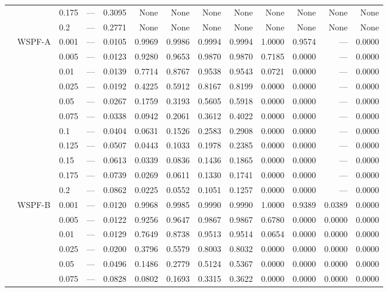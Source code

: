{\begin{longtable}{@{}lllrrrrrrrrrr@{}}
 &  & 0.175 & --- & 0.3095 & None & None & None & None & None & None & None & None \\
 &  & 0.2 & --- & 0.2771 & None & None & None & None & None & None & None & None \\
 & WSPF-A & 0.001 & --- & 0.0105 & 0.9969 & 0.9986 & 0.9994 & 0.9994 & 1.0000 & 0.9574 & --- & 0.0000 \\
 &  & 0.005 & --- & 0.0123 & 0.9280 & 0.9653 & 0.9870 & 0.9870 & 0.7185 & 0.0000 & --- & 0.0000 \\
 &  & 0.01 & --- & 0.0139 & 0.7714 & 0.8767 & 0.9538 & 0.9543 & 0.0721 & 0.0000 & --- & 0.0000 \\
 &  & 0.025 & --- & 0.0192 & 0.4225 & 0.5912 & 0.8167 & 0.8199 & 0.0000 & 0.0000 & --- & 0.0000 \\
 &  & 0.05 & --- & 0.0267 & 0.1759 & 0.3193 & 0.5605 & 0.5918 & 0.0000 & 0.0000 & --- & 0.0000 \\
 &  & 0.075 & --- & 0.0338 & 0.0942 & 0.2061 & 0.3612 & 0.4022 & 0.0000 & 0.0000 & --- & 0.0000 \\
 &  & 0.1 & --- & 0.0404 & 0.0631 & 0.1526 & 0.2583 & 0.2908 & 0.0000 & 0.0000 & --- & 0.0000 \\
 &  & 0.125 & --- & 0.0507 & 0.0443 & 0.1033 & 0.1978 & 0.2385 & 0.0000 & 0.0000 & --- & 0.0000 \\
 &  & 0.15 & --- & 0.0613 & 0.0339 & 0.0836 & 0.1436 & 0.1865 & 0.0000 & 0.0000 & --- & 0.0000 \\
 &  & 0.175 & --- & 0.0739 & 0.0269 & 0.0611 & 0.1330 & 0.1741 & 0.0000 & 0.0000 & --- & 0.0000 \\
 &  & 0.2 & --- & 0.0862 & 0.0225 & 0.0552 & 0.1051 & 0.1257 & 0.0000 & 0.0000 & --- & 0.0000 \\
 & WSPF-B & 0.001 & --- & 0.0120 & 0.9968 & 0.9985 & 0.9990 & 0.9990 & 1.0000 & 0.9389 & 0.0389 & 0.0000 \\
 &  & 0.005 & --- & 0.0122 & 0.9256 & 0.9647 & 0.9867 & 0.9867 & 0.6780 & 0.0000 & 0.0000 & 0.0000 \\
 &  & 0.01 & --- & 0.0129 & 0.7649 & 0.8738 & 0.9513 & 0.9514 & 0.0654 & 0.0000 & 0.0000 & 0.0000 \\
 &  & 0.025 & --- & 0.0200 & 0.3796 & 0.5579 & 0.8003 & 0.8032 & 0.0000 & 0.0000 & 0.0000 & 0.0000 \\
 &  & 0.05 & --- & 0.0496 & 0.1486 & 0.2779 & 0.5124 & 0.5367 & 0.0000 & 0.0000 & 0.0000 & 0.0000 \\
 &  & 0.075 & --- & 0.0828 & 0.0802 & 0.1693 & 0.3315 & 0.3622 & 0.0000 & 0.0000 & 0.0000 & 0.0000 \\

\end{longtable}}
